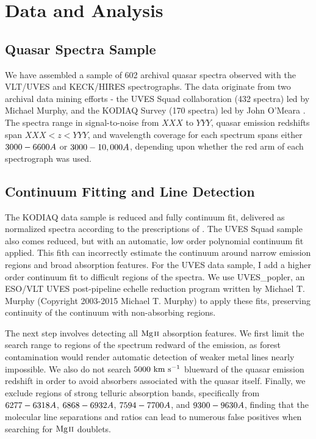 \documentclass[iop,apj,numberedappendix,appendixfloats,twocolappendix]{emulateapj}
\begin{document}

\section{Data and Analysis}
\label{sec:data}

\subsection{Quasar Spectra Sample}

We have assembled a sample of 602 archival quasar spectra observed with the VLT/UVES and KECK/HIRES spectrographs. The data originate from two archival data mining efforts - the UVES Squad collaboration (432 spectra) led by Michael Murphy, and the KODIAQ Survey (170 spectra) led by John O'Meara \citep{OMeara2015}. The spectra range in signal-to-noise from $XXX$ to $YYY$, quasar emission redshifts span $XXX < z < YYY$, and wavelength coverage for each spectrum spans either $3000 - 6600\AA$ or $3000 - 10,000\AA$, depending upon whether the red arm of each spectrograph was used.


\subsection{Continuum Fitting and Line Detection}
\label{sec:detection}

The KODIAQ data sample is reduced and fully continuum fit, delivered as normalized spectra according to the prescriptions of \cite{OMeara2015}. The UVES Squad sample also comes reduced, but with an automatic, low order polynomial continuum fit applied. This fith can incorrectly estimate the continuum around narrow emission regions and broad absorption features. For the UVES data sample, I add a higher order continuum fit to difficult regions of the spectra. We use UVES\_popler, an ESO/VLT UVES post-pipeline echelle reduction program written by Michael T. Murphy (Copyright 2003-2015 Michael T. Murphy) to apply these fits, preserving continuity of the continuum with non-absorbing regions. 

The next step involves detecting all ${\hbox{{\rm Mg}\kern 0.1em{\sc ii}}}$ absorption features. We first limit the search range to regions of the spectrum redward of the {\Lya} emission, as {\Lya} forest contamination would render automatic detection of weaker metal lines nearly impossible. We also do not search $5000~\hbox{km~s$^{-1}$}$ blueward of the quasar emission redshift in order to avoid absorbers associated with the quasar itself. Finally, we exclude regions of strong telluric absorption bands, specifically from $6277 - 6318 \AA$, $6868 - 6932 \AA$, $7594 - 7700 \AA$, and $9300 - 9630 \AA$, finding that the molecular line separations and ratios can lead to numerous false positives when searching for ${\hbox{{\rm Mg}\kern 0.1em{\sc ii}}}$ doublets. 
\end{document}
